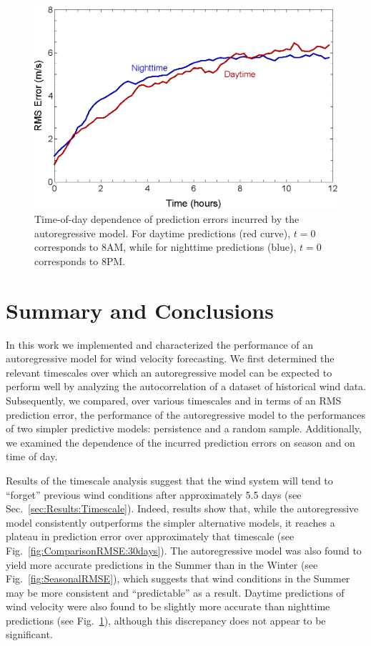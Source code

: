 \documentclass[11pt, oneside]{article}
\newcommand{\figref}[1]{Fig.~\ref{#1}}
\newcommand{\secref}[1]{Sec.~\ref{#1}}
\begin{document}
\begin{figure}[htb]
\centering
\includegraphics[width=0.7\columnwidth]{figures/DiurnalRMSPredictionError}
\caption{Time-of-day dependence of prediction errors incurred by the autoregressive model.
For daytime predictions (red curve), $t = 0$ corresponds to 8AM, while for nighttime predictions (blue), $t = 0$ corresponds to 8PM.}
\label{fig:DiurnalRMSE}
\end{figure}

\section{Summary and Conclusions}\label{sec:Conclusions}
In this work we implemented and characterized the performance of an autoregressive model for wind velocity forecasting.
We first determined the relevant timescales over which an autoregressive model can be expected to perform well by analyzing the autocorrelation of a dataset of historical wind data.
Subsequently, we compared, over various timescales and in terms of an RMS prediction error, the performance of the autoregressive model to the performances of two simpler predictive models: persistence and a random sample.
Additionally, we examined the dependence of the incurred prediction errors on season and on time of day.

Results of the timescale analysis suggest that the wind system will tend to ``forget'' previous wind conditions after approximately 5.5 days (see \secref{sec:Results:Timescale}).
Indeed, results show that, while the autoregressive model consistently outperforms the simpler alternative models, it reaches a plateau in prediction error over approximately that timescale (see \figref{fig:ComparisonRMSE:30days}).
The autoregressive model was also found to yield more accurate predictions in the Summer than in the Winter (see \figref{fig:SeasonalRMSE}), which suggests that wind conditions in the Summer may be more consistent and ``predictable'' as a result.
Daytime predictions of wind velocity were also found to be slightly more accurate than nighttime predictions (see \figref{fig:DiurnalRMSE}), although this discrepancy does not appear to be significant.
\end{document}

